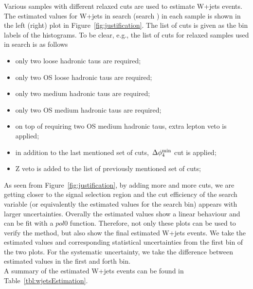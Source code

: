 Various samples with different relaxed cuts are used to estimate W+jets events. The estimated values 
for W+jets in search \binone (search \bintwo) in each sample is shown in the left (right) plot 
in Figure~\ref{fig:justification}. The list of cuts is given as the bin labels of the histograms. To be clear, e.g., 
the list of cuts for relaxed samples used in search \binone is as follows   
\begin{itemize}
\item only two loose hadronic taus are required;
\item only two OS loose hadronic taus are required;
\item only two medium hadronic taus are required;
\item only two OS medium hadronic taus are required;
\item on top of requiring two OS medium hadronic taus, extra lepton veto is applied;
\item in addition to the last mentioned set of cuts, $\,{\Delta\phi_{4}^{\rm min}}$ cut is applied;
\item Z veto is added to the list of previously mentioned set of cuts;
 \end{itemize}
As seen from Figure~\ref{fig:justification}, by adding more and more cuts, we are getting closer to the signal selection region 
and the cut efficiency of the search variable (or equivalently the estimated values for the search bin) 
appears with larger uncertainties. Overally the estimated values show a linear behaviour and can be fit with a $pol0$ function. 
Therefore, not only these plots can be used to verify the method, but also show the final estimated W+jets events. We take the estimated 
values and corresponding statistical uncertainties from the first bin of the two plots. For the systematic uncertainty, we take the
difference between estimated values in the first and forth bin.\\
A summary of the estimated W+jets events can be found in Table~\ref{tbl:wjetsEstimation}. 


